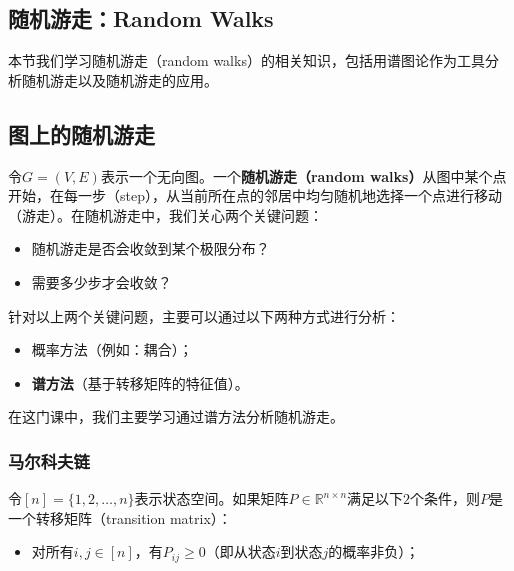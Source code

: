 \documentclass[lang=cn,newtx,10pt,scheme=chinese,chinesefont=nofont,citestyle=gb7714-2015, bibstyle=gb7714-2015]{elegantbook}
\begin{document}
\begin{refsection}
\chapter{随机游走：Random Walks}

本节我们学习随机游走（random walks）的相关知识，包括用谱图论作为工具分析随机游走以及随机游走的应用。


    
    
    
\section{图上的随机游走}

令$G=(V,E)$表示一个无向图。一个\textbf{随机游走（random walks）}从图中某个点开始，在每一步（step），从当前所在点的邻居中均匀随机地选择一个点进行移动（游走）。在随机游走中，我们关心两个关键问题：
\begin{itemize}
    \item 随机游走是否会收敛到某个极限分布？
    \item 需要多少步才会收敛？
\end{itemize}

\vspace{0.3cm}
针对以上两个关键问题，主要可以通过以下两种方式进行分析：
\begin{itemize}
    \item 概率方法（例如：耦合）；
    \item \textbf{谱方法}（基于转移矩阵的特征值）。
\end{itemize}

在这门课中，我们主要学习通过谱方法分析随机游走。



\subsection{马尔科夫链}

\begin{definition}[转移矩阵]
    \label{defn:transition-matrix}
    令$[n]=\{1,2,\dots,n\}$表示状态空间。如果矩阵$P\in\mathbb{R}^{n\times n}$满足以下$2$个条件，则$P$是一个转移矩阵（transition matrix）：
    \begin{itemize}
        \item 对所有$i,j\in [n]$，有$P_{ij}\ge 0$（即从状态$i$到状态$j$的概率非负）；
            

\end{itemize}
\end{definition}
\end{refsection}
\end{document}
